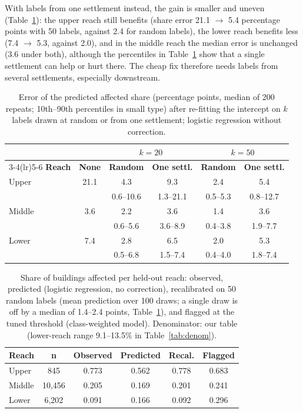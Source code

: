 \documentclass[journal,a4paper]{IEEEtran}
\begin{document}
With labels from one settlement instead, the gain is smaller and uneven (Table~\ref{tab:clrecal}): the upper reach still benefits (share error 21.1 $\rightarrow$ 5.4 percentage points with 50 labels, against 2.4 for random labels), the lower reach benefits less (7.4 $\rightarrow$ 5.3, against 2.0), and in the middle reach the median error is unchanged (3.6 under both), although the percentiles in Table~\ref{tab:clrecal} show that a single settlement can help or hurt there. The cheap fix therefore needs labels from several settlements, especially downstream.

\begin{table}[t]
\centering\footnotesize
\setlength{\tabcolsep}{4pt}
\caption{Error of the predicted affected share (percentage points, median of 200 repeats; 10th--90th percentiles in small type) after re-fitting the intercept on $k$ labels drawn at random or from one settlement; logistic regression without correction.}\label{tab:clrecal}
\begin{tabular}{@{}lccccc@{}}
\toprule
 & & \multicolumn{2}{c}{$k = 20$} & \multicolumn{2}{c}{$k = 50$}\\
\cmidrule(lr){3-4}\cmidrule(lr){5-6}
\textbf{Reach} & \textbf{None} & \textbf{Random} & \textbf{One settl.} & \textbf{Random} & \textbf{One settl.}\\
\midrule
Upper & 21.1 & 4.3 & 9.3 & 2.4 & 5.4\\
 & & {\scriptsize 0.6--10.6} & {\scriptsize 1.3--21.1} & {\scriptsize 0.5--5.3} & {\scriptsize 0.8--12.7}\\
Middle & 3.6 & 2.2 & 3.6 & 1.4 & 3.6\\
 & & {\scriptsize 0.6--5.6} & {\scriptsize 3.6--8.9} & {\scriptsize 0.4--3.8} & {\scriptsize 1.9--7.7}\\
Lower & 7.4 & 2.8 & 6.5 & 2.0 & 5.3\\
 & & {\scriptsize 0.5--6.8} & {\scriptsize 1.5--7.4} & {\scriptsize 0.4--4.0} & {\scriptsize 1.8--7.4}\\
\bottomrule
\end{tabular}
\end{table}

\begin{table}[t]
\centering\footnotesize
\setlength{\tabcolsep}{3pt}
\caption{Share of buildings affected per held-out reach: observed, predicted (logistic regression, no correction), recalibrated on 50 random labels (mean prediction over 100 draws; a single draw is off by a median of 1.4--2.4 points, Table~\ref{tab:clrecal}), and flagged at the tuned threshold (class-weighted model). Denominator: our table (lower-reach range 9.1--13.5\% in Table~\ref{tab:denom}).}\label{tab:share}
\begin{tabular}{@{}lccccc@{}}
\toprule
\textbf{Reach} & \textbf{n} & \textbf{Observed} & \textbf{Predicted} & \textbf{Recal.} & \textbf{Flagged}\\
\midrule
Upper & 845 & 0.773 & 0.562 & 0.778 & 0.683\\
Middle & 10,456 & 0.205 & 0.169 & 0.201 & 0.241\\
Lower & 6,202 & 0.091 & 0.166 & 0.092 & 0.296\\
\bottomrule
\end{tabular}
\end{table}
\end{document}
